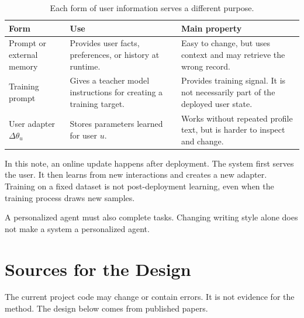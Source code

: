 \documentclass[11pt]{article}
\newcommand{\adapter}{\Delta\theta_u}
\begin{document}
\begin{table}[ht]
  \centering
  \caption{Each form of user information serves a different purpose.}
  \begin{tabularx}{\textwidth}{@{}L{0.20\textwidth}L{0.34\textwidth}Y@{}}
    \toprule
    Form & Use & Main property \\
    \midrule
    Prompt or external memory &
    Provides user facts, preferences, or history at runtime. &
    Easy to change, but uses context and may retrieve the wrong record. \\
    Training prompt &
    Gives a teacher model instructions for creating a training target. &
    Provides training signal. It is not necessarily part of the deployed
    user state. \\
    User adapter \(\adapter\) &
    Stores parameters learned for user \(u\). &
    Works without repeated profile text, but is harder to inspect and change. \\
    \bottomrule
  \end{tabularx}
\end{table}

In this note, an online update happens after deployment. The system first
serves the user. It then learns from new interactions and creates a new
adapter. Training on a fixed dataset is not post-deployment learning, even
when the training process draws new samples.

A personalized agent must also complete tasks. Changing writing style alone
does not make a system a personalized agent.

\section{Sources for the Design}

The current project code may change or contain errors. It is not evidence for
the method. The design below comes from published papers.
\end{document}
